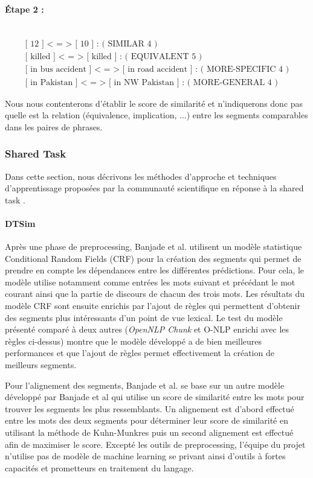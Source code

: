 \documentclass[a4paper, twoside, 11pt]{article}
\begin{document}
  \paragraph{Étape 2 :}\mbox{}\\
 \begin{eqnarray*}
\textrm{[ 12 ] < = > [ 10 ] : ( SIMILAR 4 )}\\
\textrm{[ killed ] < = > [ killed ] : ( EQUIVALENT 5 )}\\
\textrm{[ in bus accident ] < = > [ in road accident ] : ( MORE-SPECIFIC 4 )}\\
\textrm{[ in Pakistan ] < = > [ in NW Pakistan ] : ( MORE-GENERAL 4 )}
\end{eqnarray*}

 Nous nous contenterons d'établir le score de similarité et n'indiquerons donc pas quelle est la relation (équivalence, implication, ...) entre les segments comparables dans les paires de phrases.

        \subsubsection{Shared Task}
 Dans cette section, nous décrivons les méthodes d'approche et techniques d'apprentissage proposées par la communauté scientifique en réponse à la \og shared task \fg{}.

            \paragraph{DTSim}
        \hfill \break
        Après une phase de preprocessing, Banjade et al. \cite{banjade} utilisent un modèle statistique Conditional Random Fields (CRF) pour la création des segments qui permet de prendre en compte les dépendances entre les différentes prédictions. Pour cela, le modèle utilise notamment comme entrées les mots suivant et précédant le mot courant ainsi que la partie de discours de chacun des trois mots.
Les résultats du modèle CRF sont ensuite enrichis par l'ajout de règles qui permettent d'obtenir des segments plus intéressants d'un point de vue lexical. Le test du modèle présenté comparé à deux autres (\textit{OpenNLP Chunk} et O-NLP enrichi avec les règles ci-dessus) montre que le modèle développé a de bien meilleures performances et que l'ajout de règles permet effectivement la création de meilleurs segments.

 Pour l'alignement des segments, Banjade et al. se base sur un autre modèle développé par Banjade et al \cite{banjadeautre} qui utilise un score de similarité entre les mots pour trouver les segments les plus ressemblants. Un alignement est d'abord effectué entre les mots des deux segments pour déterminer leur score de similarité en utilisant la méthode de Kuhn-Munkres puis un second alignement est effectué afin de maximiser le score. Excepté les outils de preprocessing, l'équipe du projet n'utilise pas de modèle de machine learning se privant ainsi d'outils à fortes capacités et prometteurs en traitement du langage.
\end{document}
